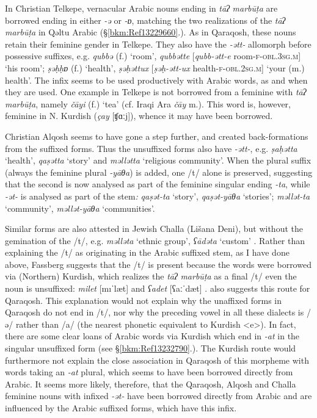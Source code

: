 \documentclass[output=paper]{langsci/langscibook}
\begin{document}
In Christian Telkepe, vernacular Arabic nouns ending in \textit{tāʔ} \textit{marbūṭa} are borrowed ending in either \textit{\nobreakdash-ə} or \textit{\nobreakdash-ɒ}, matching the two realizations of the \textit{tāʔ} \textit{marbūṭa} in Qəltu Arabic (§\ref{bkm:Ref13229660}.). As in Qaraqosh, these nouns retain their feminine gender in Telkepe. They also have the \textit{\nobreakdash-ətt-} allomorph before possessive suffixes, e.g. \textit{qubbə} (f.) ‘room’, \textit{qubbətte} [\textit{qubb-ətt-e} room-\textsc{f-obl.3sg.m}] ‘his room’; \textit{ṣəḥḥɒ} (f.) ‘health’,  \textit{ṣəḥəttux} [\textit{ṣəḥ-ətt-ux} health-\textsc{f-obl.2sg.m}] ‘your (m.) health’. The infix seems to be used productively with Arabic words, as and when they are used. One example in Telkepe is not borrowed from a feminine with \textit{tāʔ} \textit{marbūṭa}, namely \textit{čāyi} (f.) ‘tea’ (cf. Iraqi Ara \textit{čāy} m.). This word is, however, feminine in N. Kurdish (\textit{çay} [ʧɑːj]), whence it may have been borrowed.

Christian Alqosh seems to have gone a step further, and created back-formations from the suffixed forms. Thus the unsuffixed forms also have \textit{{}-ətt-}, e.g. \textit{ṣaḥətta} ‘health’, \textit{qaṣətta} ‘story’ and \textit{məllətta} ‘religious community’. When the plural suffix (always the feminine plural \textit{\nobreakdash-yāθa}) is added, one /t/ alone is preserved, suggesting that the second is now analysed as part of the feminine singular ending \textit{\nobreakdash-ta}, while \textit{\nobreakdash-ət\nobreakdash-} is analysed as part of the stem\textit{:} \textit{qaṣət\nobreakdash-ta} ‘story’, \textit{qaṣət\nobreakdash-yāθa} ‘stories’; \textit{məllət\nobreakdash-ta} ‘community’, \textit{məllət\nobreakdash-yāθa} ‘communities’.

Similar forms are also attested in Jewish Challa (Lišana Deni), but without the gemination of the /t/, e.g. \textit{məlləta} ‘ethnic group’, \textit{ʕādəta} ‘custom’ \citep[52]{Fassberg2010}. Rather than explaining the /t/ as originating in the Arabic suffixed stem, as I have done above, Fassberg suggests that the /t/ is present because the words were borrowed via (Northern) Kurdish, which realizes the \textit{tāʔ} \textit{marbūṭa} as a final /t/ even the noun is unsuffixed: \textit{milet} [mıˈlæt] and \textit{ʕadet} [ʕaːˈdæt] \citep[387]{Chyet2003}. \citep[206]{Khan2002} also suggests this route for Qaraqosh. This explanation would not explain why the unaffixed forms in Qaraqosh do not end in /t/, nor why the preceding vowel in all these dialects is /ə/ rather than /a/ (the nearest phonetic equivalent to Kurdish <e>). In fact, there are some clear loans of Arabic words via Kurdish which end in \textit{{}-at} in the singular unsuffixed form (see §\ref{bkm:Ref13232790}.). The Kurdish route would furthermore not explain the close association in Qaraqosh of this morpheme with words taking an \textit{\nobreakdash-at} plural, which seems to have been borrowed directly from Arabic. It seems more likely, therefore, that the Qaraqosh, Alqosh and Challa feminine nouns with infixed \textit{\nobreakdash-ət\nobreakdash-} have been borrowed directly from Arabic and are influenced by the Arabic suffixed forms, which have this infix.
\end{document}
